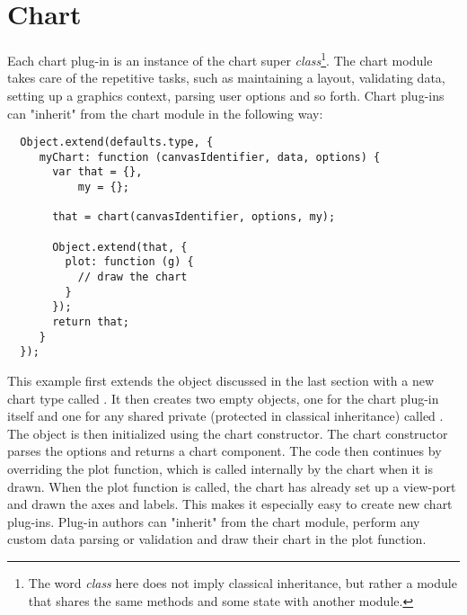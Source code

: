 \section{Chart}
Each chart plug-in is an instance of the chart super \emph{class}\footnote{The word \emph{class} here does not imply classical inheritance, but rather a module that shares the same methods and some state with another module.}. The chart module takes care of the repetitive tasks, such as maintaining a layout, validating data, setting up a graphics context, parsing user options and so forth. Chart plug-ins can "inherit" from the chart module in the following way:

\begin{verbatim}
  Object.extend(defaults.type, {
     myChart: function (canvasIdentifier, data, options) {
       var that = {},
           my = {};
   
       that = chart(canvasIdentifier, options, my);
       
       Object.extend(that, {
         plot: function (g) {
           // draw the chart
         }
       });
       return that;
     }
  });
\end{verbatim}

This example first extends the  object discussed in the last section with a new chart type called . It then creates two empty objects, one for the chart plug-in itself and one for any shared private (protected in classical inheritance) called . The  object is then initialized using the chart constructor. The chart constructor parses the options and returns a chart component. The code then continues by overriding the plot function, which is called internally by the chart when it is drawn. When the plot function is called, the chart has already set up a view-port and drawn the axes and labels. This makes it especially easy to create new chart plug-ins. Plug-in authors can "inherit" from the chart module, perform any custom data parsing or validation and draw their chart in the plot function.

